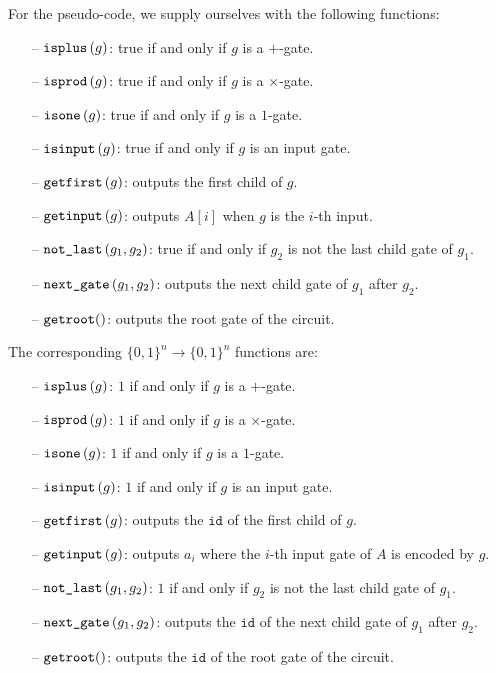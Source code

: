 For the pseudo-code, we supply ourselves with the following functions:

\begin{itemize}
	\item[--] $\texttt{isplus}\left( g \right)$: true if and only if $g$ is a $+$-gate.
	\item[--] $\texttt{isprod}\left(g \right)$: true if and only if $g$ is a $\times$-gate.
	\item[--] $\texttt{isone}\left(g \right)$: true if and only if $g$ is a $1$-gate.
	\item[--] $\texttt{isinput}\left(g \right)$: true if and only if $g$ is an input gate.
	\item[--] $\texttt{getfirst}\left(g \right)$: outputs the first child of $g$.
	\item[--] $\texttt{getinput}\left(g \right)$: outputs $A[i]$ when $g$ is the $i$-th input.
	\item[--] $\texttt{not{\_}last}\left(g_1,g_2 \right)$: true if and only if $g_2$ is not the last child gate of $g_1$.
	\item[--] $\texttt{next{\_}gate}\left(g_1, g_2 \right)$: outputs the next child gate of $g_1$ after $g_2$.
	\item[--] $\texttt{getroot}()$: outputs the root gate of the circuit.
\end{itemize}

The corresponding $\lbrace 0,1 \rbrace^n\rightarrow\lbrace 0,1 \rbrace^n$ functions are:

\begin{itemize}
	\item[--] $\texttt{isplus}\left( g \right)$: $1$ if and only if $g$ is a $+$-gate.
	\item[--] $\texttt{isprod}\left(g \right)$: $1$ if and only if $g$ is a $\times$-gate.
	\item[--] $\texttt{isone}\left(g \right)$: $1$ if and only if $g$ is a $1$-gate.
	\item[--] $\texttt{isinput}\left(g \right)$: $1$ if and only if $g$ is an input gate.
	\item[--] $\texttt{getfirst}\left(g \right)$: outputs the $\texttt{id}$ of the first child of $g$.
	\item[--] $\texttt{getinput}\left(g \right)$: outputs $a_i$ where the $i$-th input gate of $A$ is encoded by $g$.
	\item[--] $\texttt{not{\_}last}\left(g_1,g_2 \right)$: $1$ if and only if $g_2$ is not the last child gate of $g_1$.
	\item[--] $\texttt{next{\_}gate}\left(g_1, g_2 \right)$: outputs the $\texttt{id}$ of the next child gate of $g_1$ after $g_2$.
	\item[--] $\texttt{getroot}()$: outputs the $\texttt{id}$ of the root gate of the circuit.
\end{itemize}

